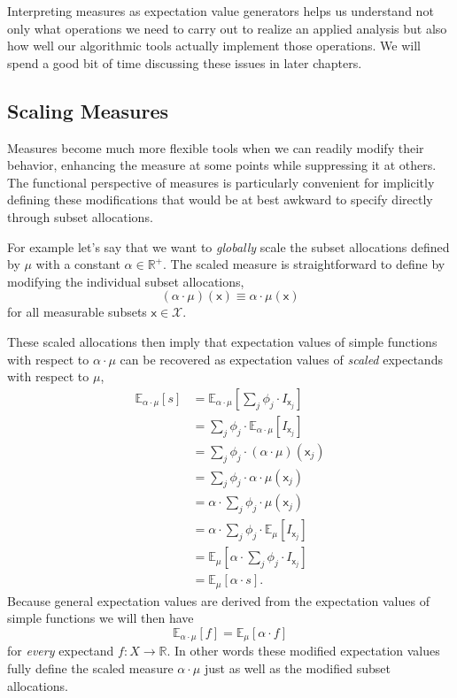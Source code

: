 \documentclass[
  letterpaper,
  DIV=11,
  numbers=noendperiod]{scrartcl}
\begin{document}
Interpreting measures as expectation value generators helps us
understand not only what operations we need to carry out to realize an
applied analysis but also how well our algorithmic tools actually
implement those operations. We will spend a good bit of time discussing
these issues in later chapters.

\hypertarget{sec:scaling-measures}{%
\subsection{Scaling Measures}\label{sec:scaling-measures}}

Measures become much more flexible tools when we can readily modify
their behavior, enhancing the measure at some points while suppressing
it at others. The functional perspective of measures is particularly
convenient for implicitly defining these modifications that would be at
best awkward to specify directly through subset allocations.

For example let's say that we want to \emph{globally} scale the subset
allocations defined by \(\mu\) with a constant
\(\alpha \in \mathbb{R}^{+}\). The scaled measure is straightforward to
define by modifying the individual subset allocations, \[
(\alpha \cdot \mu)(\mathsf{x}) \equiv \alpha \cdot \mu(\mathsf{x})
\] for all measurable subsets \(\mathsf{x} \in \mathcal{X}\).

These scaled allocations then imply that expectation values of simple
functions with respect to \(\alpha \cdot \mu\) can be recovered as
expectation values of \emph{scaled} expectands with respect to \(\mu\),
\begin{align*}
\mathbb{E}_{\alpha \cdot \mu} [ s ]
&=
\mathbb{E}_{\alpha \cdot \mu}
\left[ \sum_{j} \phi_{j} \cdot I_{\mathsf{x}_{j}} \right]
\\
&=
\sum_{j} \phi_{j} \cdot
\mathbb{E}_{\alpha \cdot \mu} [ I_{\mathsf{x}_{j}} ]
\\
&=
\sum_{j} \phi_{j} \cdot (\alpha \cdot \mu)(\mathsf{x}_{j})
\\
&=
\sum_{j} \phi_{j} \cdot \alpha \cdot \mu(\mathsf{x}_{j})
\\
&=
\alpha \cdot \sum_{j} \phi_{j} \cdot \mu(\mathsf{x}_{j})
\\
&=
\alpha \cdot \sum_{j} \phi_{j} \cdot
\mathbb{E}_{\mu}
[ I_{\mathsf{x}_{j}} ]
\\
&=
\mathbb{E}_{\mu}
\left[ \alpha \cdot \sum_{j} \phi_{j} \cdot I_{\mathsf{x}_{j}} \right]
\\
&=
\mathbb{E}_{\mu} [ \alpha \cdot s ].
\end{align*} Because general expectation values are derived from the
expectation values of simple functions we will then have \[
\mathbb{E}_{\alpha \cdot \mu} [ f ] = \mathbb{E}_{\mu} [ \alpha \cdot f ]
\] for \emph{every} expectand \(f: X \rightarrow \mathbb{R}\). In other
words these modified expectation values fully define the scaled measure
\(\alpha \cdot \mu\) just as well as the modified subset allocations.
\end{document}

